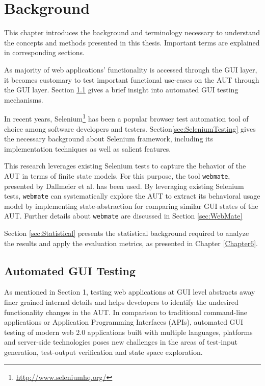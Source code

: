 \chapter{Background}
\label{Chapter2}


This chapter introduces the background and terminology necessary to understand the concepts and methods presented in this thesis. Important terms are explained in corresponding sections.

As majority of web applications' functionality is accessed through the GUI layer, it becomes customary to test important functional use-cases on the AUT through the GUI layer. Section \ref{sec:AutomatedGUITesting} gives a brief insight into automated GUI testing mechanisms.

In recent years, Selenium\footnote{\url{http://www.seleniumhq.org/}} has been a popular browser test automation tool of choice among software developers and testers. Section\ref{sec:SeleniumTesting} gives the necessary background about Selenium framework, including its implementation techniques as well as salient features.

This research leverages existing Selenium tests to capture the behavior of the AUT in terms of finite state models. For this purpose, the tool \texttt{webmate}, presented by Dallmeier et al.\cite{webmate} has been used. By leveraging existing Selenium tests, \texttt{webmate} can systematically explore the AUT to extract its behavioral usage model by implementing state-abstraction for comparing similar GUI states of the AUT. Further details about \texttt{webmate} are discussed in Section \ref{sec:WebMate}

Section \ref{sec:Statistical} presents the statistical background required to analyze the results and apply the evaluation metrics, as presented in Chapter \ref{Chapter6}.

\section{Automated GUI Testing}
\label{sec:AutomatedGUITesting}
As mentioned in Section 1, testing web applications at GUI level abstracts away finer grained internal details and helps developers to identify the undesired functionality changes in the AUT.  In comparison to traditional command-line applications or Application Programming Interfaces (APIs), automated GUI testing of modern web 2.0 applications built with multiple languages, platforms and server-side technologies poses new challenges in the areas of test-input generation, test-output verification and state space exploration.

